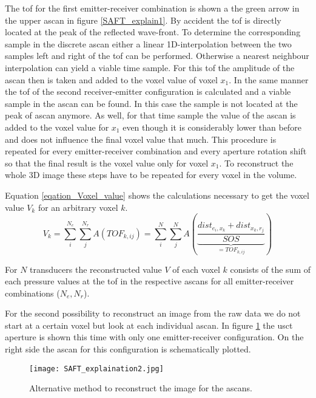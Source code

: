 The \ac{tof} for the first emitter-receiver combination is shown a the green arrow in the upper \ac{ascan} in figure \ref{SAFT_explain1}. By accident the \ac{tof} is directly located at the peak of the reflected wave-front. To determine the corresponding sample in the discrete \ac{ascan} either a linear 1D-interpolation between the two samples left and right of the \ac{tof} can be performed. Otherwise a nearest neighbour interpolation can yield a viable time sample.
For this \ac{tof} the amplitude of the \ac{ascan} then is taken and added to the voxel value of voxel $x_1$. 
In the same manner the \ac{tof} of the second receiver-emitter configuration is calculated and a viable sample in the \ac{ascan} can be found. In this case the sample is not located at the peak of \ac{ascan} anymore. As well, for that time sample the value of the \ac{ascan} is added to the voxel value for $x_1$ even though it is considerably lower than before and does not influence the final voxel value that much. 
This procedure is repeated for every emitter-receiver combination and every aperture rotation shift so that the final result is the voxel value only for voxel $x_1$.
To reconstruct the whole 3D image these steps have to be repeated for every voxel in the volume.

Equation \ref{eqation_Voxel_value} shows the calculations necessary to get the voxel value $V_k$ for an arbitrary voxel $k$. 
\begin{equation}
V_k = \sum_{i}^{N_e}\sum_{j}^{N_r} A(TOF_{k,ij}) = \sum_{i}^{N}\sum_{j}^{N} A \left (\underset{ = TOF_{k,ij} } {\underbrace{\frac{ dist_{e_i,x_k} + dist_{x_k,r_{j}}}{SOS} }}  \right )
\label{eqation_Voxel_value}
\end{equation}

For $N$ transducers the reconstructed value $V$ of each voxel $k$ consists of the sum of each pressure values at the \ac{tof} in the respective \acp{ascan} for all emitter-receiver combinations ($N_e, N_r$). 

\bigskip

For the second possibility to reconstruct an image from the raw data we do not start at a certain voxel but look at each individual \ac{ascan}. In figure \ref{SAFT_explain2} the \ac{usct} aperture is shown this time with only one emitter-receiver configuration. On the right side the \ac{ascan} for this configuration is schematically plotted.

\begin{figure}[H]
    \centering
    \texttt{[image: SAFT\_explaination2.jpg]}
    \caption{ Alternative method to reconstruct the image for the \acp{ascan}. }
    \label{SAFT_explain2}
\end{figure}


